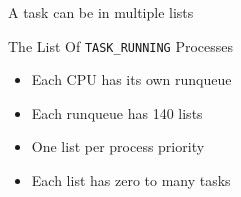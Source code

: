 \begin{frame}
  \begin{block}{A task can be in multiple lists}
    \begin{center}
    \end{center}
  \end{block}
\end{frame}

\begin{frame}[fragile=singleslide]{The List Of \texttt{TASK\_RUNNING} Processes}
  \begin{minipage}{.69\textwidth}
    \begin{itemize}
    \item Each CPU has its own runqueue
    \item Each runqueue has 140 lists
    \item One list per process priority
    \item Each list has zero to many tasks
    \end{itemize}
  \end{minipage}\hfill
  \begin{minipage}{.3\textwidth}
    \begin{center}
    \end{center}
  \end{minipage}
  \vspace{2em}
  \begin{center}
    \begin{minipage}{.5\textwidth}
      \inputminted{c}{../figs/run-list.c}
    \end{minipage}
  \end{center}
\end{frame}

